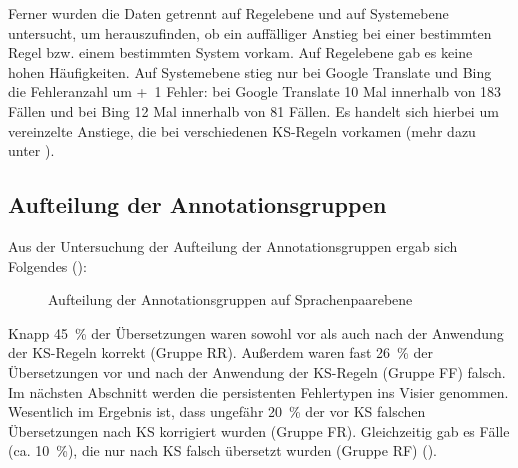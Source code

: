 Ferner wurden die Daten getrennt auf Regelebene und auf Systemebene untersucht, um herauszufinden, ob ein auffälliger Anstieg bei einer bestimmten Regel bzw. einem bestimmten System vorkam. Auf Regelebene gab es keine hohen Häufigkeiten. Auf Systemebene stieg nur bei Google Translate und Bing die Fehleranzahl um +~1 Fehler: bei Google Translate 10 Mal innerhalb von 183 Fällen und bei Bing 12 Mal innerhalb von 81 Fällen. Es handelt sich hierbei um vereinzelte Anstiege, die bei verschiedenen KS-Regeln vorkamen (mehr dazu unter ).

\subsection{Aufteilung der Annotationsgruppen}
\label{sec:5.2.3}
Aus der Untersuchung der Aufteilung der Annotationsgruppen ergab sich Folgendes ():



\begin{figure}

	\caption{\label{fig:05:13} Aufteilung der Annotationsgruppen auf Sprachenpaarebene}
\end{figure}

Knapp 45~\% der Übersetzungen waren sowohl vor als auch nach der Anwendung der KS-Regeln korrekt (Gruppe RR). Außerdem waren fast 26~\% der Übersetzungen vor und nach der Anwendung der KS-Regeln (Gruppe FF) falsch. Im nächsten Abschnitt werden die persistenten Fehlertypen ins Visier genommen. Wesentlich im Ergebnis ist, dass ungefähr 20~\% der vor KS falschen Übersetzungen nach KS korrigiert wurden (Gruppe FR). Gleichzeitig gab es Fälle (ca. 10~\%), die nur nach KS falsch übersetzt wurden (Gruppe RF) ().

